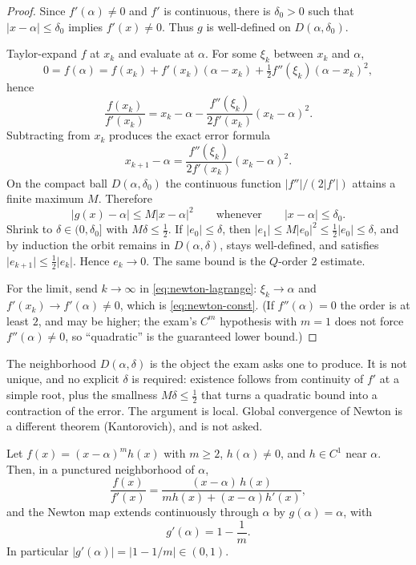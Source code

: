 \begin{proof}
Since \(f'(\alpha)\neq 0\) and \(f'\) is continuous, there is \(\delta_0>0\) such that \(\lvert x-\alpha\rvert\le\delta_0\) implies \(f'(x)\neq 0\). Thus \(g\) is well-defined on \(D(\alpha,\delta_0)\).

Taylor-expand \(f\) at \(x_k\) and evaluate at \(\alpha\). For some \(\xi_k\) between \(x_k\) and \(\alpha\),
\[
0
=
f(\alpha)
=
f(x_k)
+
f'(x_k)(\alpha-x_k)
+
\tfrac12 f''(\xi_k)(\alpha-x_k)^2,
\]
hence
\[
\frac{f(x_k)}{f'(x_k)}
=
x_k-\alpha
-
\frac{f''(\xi_k)}{2f'(x_k)}(x_k-\alpha)^2.
\]
Subtracting from \(x_k\) produces the exact error formula
\begin{equation}
\label{eq:newton-lagrange}
x_{k+1}-\alpha
=
\frac{f''(\xi_k)}{2f'(x_k)}(x_k-\alpha)^2.
\end{equation}
On the compact ball \(D(\alpha,\delta_0)\) the continuous function \(\lvert f''\rvert/(2\lvert f'\rvert)\) attains a finite maximum \(M\). Therefore
\[
\bigl\lvert g(x)-\alpha\bigr\rvert
\le
M\bigl\lvert x-\alpha\bigr\rvert^2
\qquad\text{whenever}\qquad
\lvert x-\alpha\rvert\le\delta_0.
\]
Shrink to \(\delta\in(0,\delta_0]\) with \(M\delta\le\tfrac12\). If \(\lvert e_0\rvert\le\delta\), then \(\lvert e_1\rvert\le M\lvert e_0\rvert^2\le\tfrac12\lvert e_0\rvert\le\delta\), and by induction the orbit remains in \(D(\alpha,\delta)\), stays well-defined, and satisfies \(\lvert e_{k+1}\rvert\le\tfrac12\lvert e_k\rvert\). Hence \(e_k\to 0\). The same bound is the \(Q\)-order \(2\) estimate.

For the limit, send \(k\to\infty\) in \eqref{eq:newton-lagrange}: \(\xi_k\to\alpha\) and \(f'(x_k)\to f'(\alpha)\neq 0\), which is \eqref{eq:newton-const}. (If \(f''(\alpha)=0\) the order is at least \(2\), and may be higher; the exam's \(C^m\) hypothesis with \(m=1\) does not force \(f''(\alpha)\neq 0\), so ``quadratic'' is the guaranteed lower bound.)
\end{proof}

The neighborhood \(D(\alpha,\delta)\) is the object the exam asks one to produce. It is not unique, and no explicit \(\delta\) is required: existence follows from continuity of \(f'\) at a simple root, plus the smallness \(M\delta\le\tfrac12\) that turns a quadratic bound into a contraction of the error. The argument is local. Global convergence of Newton is a different theorem (Kantorovich), and is not asked.

\begin{lemma}
\label{lem:g-multiple}
Let \(f(x)=(x-\alpha)^m h(x)\) with \(m\ge 2\), \(h(\alpha)\neq 0\), and \(h\in C^1\) near \(\alpha\). Then, in a punctured neighborhood of \(\alpha\),
\[
\frac{f(x)}{f'(x)}
=
\frac{(x-\alpha)\,h(x)}{m h(x)+(x-\alpha)h'(x)},
\]
and the Newton map extends continuously through \(\alpha\) by \(g(\alpha)=\alpha\), with
\begin{equation}
\label{eq:gprime-mult}
g'(\alpha)
=
1-\frac{1}{m}.
\end{equation}
In particular \(\lvert g'(\alpha)\rvert=\lvert 1-1/m\rvert\in(0,1)\).
\end{lemma}

